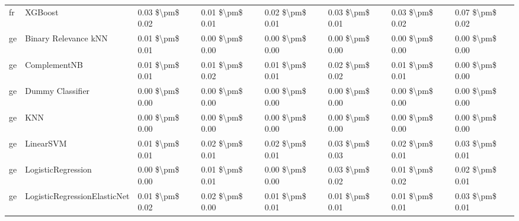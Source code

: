 \begin{tabular}{llllllll}
      fr &                         XGBoost & 0.03 \$\textbackslash pm\$ 0.02 &           0.01 \$\textbackslash pm\$ 0.01 &       0.02 \$\textbackslash pm\$ 0.01 &        0.03 \$\textbackslash pm\$ 0.01 &                         0.03 \$\textbackslash pm\$ 0.02 &     0.07 \$\textbackslash pm\$ 0.02 \\
      ge &            Binary Relevance kNN & 0.01 \$\textbackslash pm\$ 0.01 &           0.00 \$\textbackslash pm\$ 0.00 &       0.00 \$\textbackslash pm\$ 0.00 &        0.00 \$\textbackslash pm\$ 0.00 &                         0.00 \$\textbackslash pm\$ 0.00 &     0.00 \$\textbackslash pm\$ 0.00 \\
      ge &                    ComplementNB & 0.01 \$\textbackslash pm\$ 0.01 &           0.01 \$\textbackslash pm\$ 0.02 &       0.01 \$\textbackslash pm\$ 0.01 &        0.02 \$\textbackslash pm\$ 0.02 &                         0.01 \$\textbackslash pm\$ 0.01 &     0.00 \$\textbackslash pm\$ 0.00 \\
      ge &                Dummy Classifier & 0.00 \$\textbackslash pm\$ 0.00 &           0.00 \$\textbackslash pm\$ 0.00 &       0.00 \$\textbackslash pm\$ 0.00 &        0.00 \$\textbackslash pm\$ 0.00 &                         0.00 \$\textbackslash pm\$ 0.00 &     0.00 \$\textbackslash pm\$ 0.00 \\
      ge &                             KNN & 0.00 \$\textbackslash pm\$ 0.00 &           0.00 \$\textbackslash pm\$ 0.00 &       0.00 \$\textbackslash pm\$ 0.00 &        0.00 \$\textbackslash pm\$ 0.00 &                         0.00 \$\textbackslash pm\$ 0.00 &     0.00 \$\textbackslash pm\$ 0.00 \\
      ge &                       LinearSVM & 0.01 \$\textbackslash pm\$ 0.01 &           0.02 \$\textbackslash pm\$ 0.01 &       0.02 \$\textbackslash pm\$ 0.01 &        0.03 \$\textbackslash pm\$ 0.03 &                         0.02 \$\textbackslash pm\$ 0.01 &     0.03 \$\textbackslash pm\$ 0.01 \\
      ge &              LogisticRegression & 0.00 \$\textbackslash pm\$ 0.00 &           0.01 \$\textbackslash pm\$ 0.01 &       0.00 \$\textbackslash pm\$ 0.00 &        0.03 \$\textbackslash pm\$ 0.02 &                         0.01 \$\textbackslash pm\$ 0.02 &     0.02 \$\textbackslash pm\$ 0.01 \\
      ge &    LogisticRegressionElasticNet & 0.01 \$\textbackslash pm\$ 0.02 &           0.02 \$\textbackslash pm\$ 0.00 &       0.01 \$\textbackslash pm\$ 0.01 &        0.01 \$\textbackslash pm\$ 0.01 &                         0.01 \$\textbackslash pm\$ 0.01 &     0.03 \$\textbackslash pm\$ 0.01 \\

\end{tabular}
